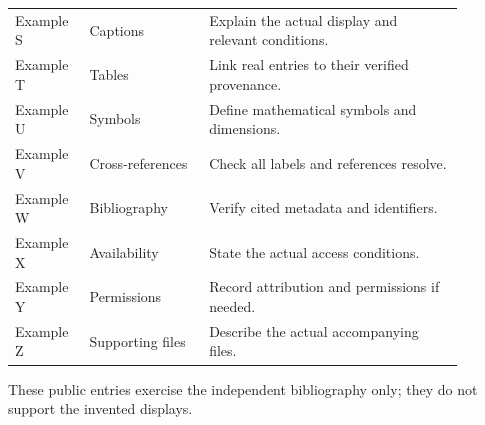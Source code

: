 \documentclass[letterpaper,11pt]{article}
\begin{document}
{\begin{longtable}{@{}p{0.14\linewidth}p{0.24\linewidth}p{0.51\linewidth}@{}}
Example S & Captions & Explain the actual display and relevant conditions.\\
Example T & Tables & Link real entries to their verified provenance.\\
Example U & Symbols & Define mathematical symbols and dimensions.\\
Example V & Cross-references & Check all labels and references resolve.\\
Example W & Bibliography & Verify cited metadata and identifiers.\\
Example X & Availability & State the actual access conditions.\\
Example Y & Permissions & Record attribution and permissions if needed.\\
Example Z & Supporting files & Describe the actual accompanying files.\\
\end{longtable}}

These public entries exercise the independent bibliography only; they do
not support the invented displays\cite{peng2011reproducible,wilkinson2016fair}.
{}

\end{document}
